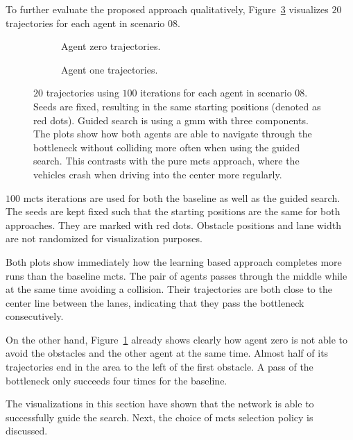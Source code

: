 To further evaluate the proposed approach qualitatively, Figure~\ref{fig:trajectories_sc10} visualizes $20$ trajectories for each agent in scenario 08.
\begin{figure}
\begin{subfigure}{\textwidth}
  \centering
  \scalebox{0.7}{
  
  }
  \caption{Agent zero trajectories.}
  \label{fig:trajectories_agent0}
\end{subfigure}

\begin{subfigure}{\textwidth}
  \centering
  \scalebox{0.7}{
  
  }
  \caption{Agent one trajectories.}
  \label{fig:trajectories_agent1}
\end{subfigure}
\caption[Agent trajectories for scenario 08]{$20$ trajectories using $100$ iterations for each agent in scenario 08. Seeds are fixed, resulting in the same starting positions (denoted as red dots). Guided search is using a \gls{gmm} with three components. The plots show how both agents are able to navigate through the bottleneck without colliding more often when using the guided search. This contrasts with the pure \gls{mcts} approach, where the vehicles crash when driving into the center more regularly. }
\label{fig:trajectories_sc10}
\end{figure}
$100$ \gls{mcts} iterations are used for both the baseline as well as the guided search. The seeds are kept fixed such that the starting positions are the same for both approaches. They are marked with red dots. Obstacle positions and lane width are not randomized for visualization purposes.

Both plots show immediately how the learning based approach completes more runs than the baseline \gls{mcts}. The pair of agents passes through the middle while at the same time avoiding a collision. Their trajectories are both close to the center line between the lanes, indicating that they pass the bottleneck consecutively.

On the other hand, Figure~\ref{fig:trajectories_agent0} already shows clearly how agent zero is not able to avoid the obstacles and the other agent at the same time. Almost half of its trajectories end in the area to the left of the first obstacle. A pass of the bottleneck only succeeds four times for the baseline.

The visualizations in this section have shown that the network is able to successfully guide the search. Next, the choice of \gls{mcts} selection policy is discussed.


